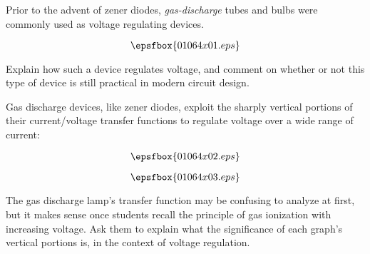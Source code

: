 

Prior to the advent of zener diodes, {\it gas-discharge} tubes and bulbs were commonly used as voltage regulating devices.  

$$\epsfbox{01064x01.eps}$$

Explain how such a device regulates voltage, and comment on whether or not this type of device is still practical in modern circuit design.







Gas discharge devices, like zener diodes, exploit the sharply vertical portions of their current/voltage transfer functions to regulate voltage over a wide range of current:

$$\epsfbox{01064x02.eps}$$

\vskip 10pt

$$\epsfbox{01064x03.eps}$$







The gas discharge lamp's transfer function may be confusing to analyze at first, but it makes sense once students recall the principle of gas ionization with increasing voltage.  Ask them to explain what the significance of each graph's vertical portions is, in the context of voltage regulation.




